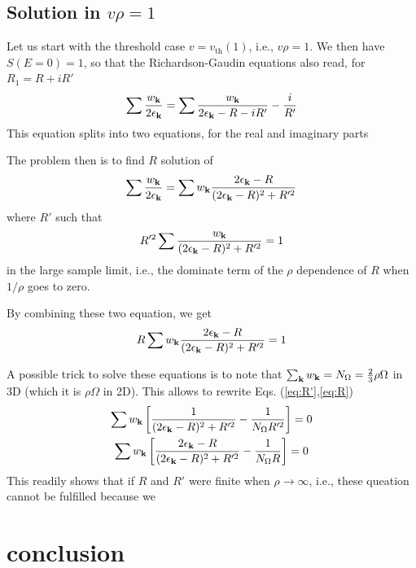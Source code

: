 \documentclass{article}
\begin{document}
\subsection{Solution in $v\rho=1$}
Let us start with the threshold case $v=v_{\text{th}}(1)$, i.e., $v\rho=1$.  We then have $S(E=0)=1$, so that the Richardson-Gaudin equations also read, for $R_1=R+iR'$
\begin{equation}
\sum\frac{w_{\mathbf{k}}}{2\epsilon_{\mathbf{k}}}=\sum\frac{w_{\mathbf{k}}}{2\epsilon_{\mathbf{k}}-R-iR'}-\frac{i}{R'}
\label{eq:}
\end{equation}
This equation splits into two equations, for the real and imaginary parts

The problem then is to find $R$ solution of 
\begin{equation}
\sum\frac{w_{\mathbf{k}}}{2\epsilon_{\mathbf{k}}}=\sum{}w_{\mathbf{k}}\frac{2\epsilon_{\mathbf{k}}-R}{(2\epsilon_{\mathbf{k}}-R)^2+R'^2}
\label{eq:}
\end{equation}
where $R'$ such that 
\begin{equation}
R'^2\sum{}\frac{w_{\mathbf{k}}}{(2\epsilon_{\mathbf{k}}-R)^2+R'^2}=1
\label{eq:R'}
\end{equation}
in the large sample limit, i.e., the dominate term of the $\rho$ dependence of $R$ when $1/\rho$ goes to zero. 

By combining these two equation, we get
\begin{equation}
R\sum{}w_{\mathbf{k}}\frac{2\epsilon_{\mathbf{k}}-R}{(2\epsilon_{\mathbf{k}}-R)^2+R'^2}=1
\label{eq:R}
\end{equation}

A possible trick to solve these equations is to note that $\sum_{\mathbf{k}}{}w_{\mathbf{k}}=N_\Omega=\frac23\rho\Omega$ in 3D (which it is $\rho\Omega$ in 2D).  This allows to rewrite Eqs. (\ref{eq:R'},\ref{eq:R})
\begin{gather}
\sum{}w_{\mathbf{k}}\left[\frac{1}{(2\epsilon_{\mathbf{k}}-R)^2+R'^2}-\frac{1}{N_\Omega{}R'^2}\right]=0\\
\sum{}w_{\mathbf{k}}\left[\frac{2\epsilon_{\mathbf{k}}-R}{(2\epsilon_{\mathbf{k}}-R)^2+R'^2}-\frac{1}{N_\Omega{}R}\right]=0
\end{gather}
This readily shows that if $R$ and $R'$ were finite when $\rho\rightarrow\infty$, i.e., these queation cannot be fulfilled because we 


\section{conclusion\label{sec:conclusion}}


%

\end{document}
